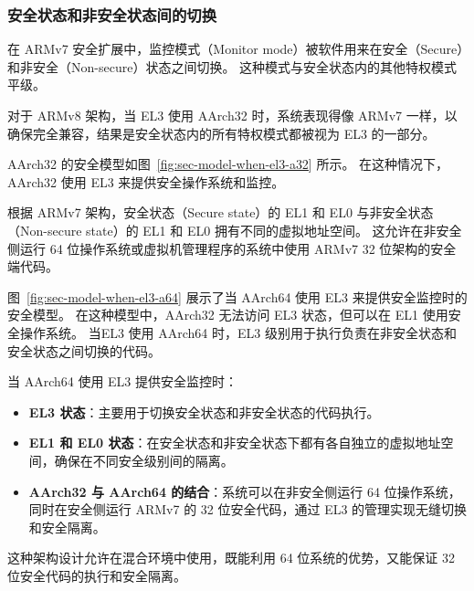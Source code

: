 \subsubsection{安全状态和非安全状态间的切换}

在 ARMv7 安全扩展中，监控模式（Monitor mode）被软件用来在安全（Secure）和非安全（Non-secure）状态之间切换。
这种模式与安全状态内的其他特权模式平级。

对于 ARMv8 架构，当 EL3 使用 AArch32 时，系统表现得像 ARMv7 一样，以确保完全兼容，结果是安全状态内的所有特权模式都被视为 EL3 的一部分。

AArch32 的安全模型如图~\ref{fig:sec-model-when-el3-a32} 所示。
在这种情况下，AArch32 使用 EL3 来提供安全操作系统和监控。


根据 ARMv7 架构，安全状态（Secure state）的 EL1 和 EL0 与非安全状态（Non-secure state）的 EL1 和 EL0 拥有不同的虚拟地址空间。
这允许在非安全侧运行 64 位操作系统或虚拟机管理程序的系统中使用 ARMv7 32 位架构的安全端代码。

图~\ref{fig:sec-model-when-el3-a64} 展示了当 AArch64 使用 EL3 来提供安全监控时的安全模型。
在这种模型中，AArch32 无法访问 EL3 状态，但可以在 EL1 使用安全操作系统。
当EL3 使用 AArch64 时，EL3 级别用于执行负责在非安全状态和安全状态之间切换的代码。

当 AArch64 使用 EL3 提供安全监控时：
\begin{itemize}
\item
  \textbf{EL3 状态}：主要用于切换安全状态和非安全状态的代码执行。
\item
  \textbf{EL1 和 EL0 状态}：在安全状态和非安全状态下都有各自独立的虚拟地址空间，确保在不同安全级别间的隔离。
\item
  \textbf{AArch32 与 AArch64 的结合}：系统可以在非安全侧运行 64 位操作系统，同时在安全侧运行 ARMv7 的 32 位安全代码，通过 EL3 的管理实现无缝切换和安全隔离。
\end{itemize}

这种架构设计允许在混合环境中使用，既能利用 64 位系统的优势，又能保证 32 位安全代码的执行和安全隔离。

